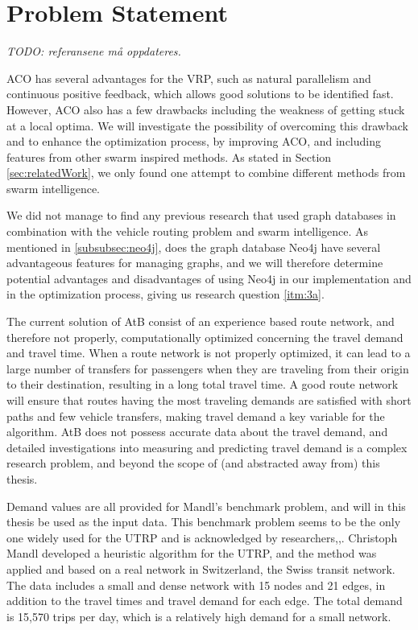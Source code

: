\section{Problem Statement}
\label{sec:problemStatement}

\emph{\color{blue} TODO: referansene må oppdateres.}

ACO has several advantages for the VRP, such as natural parallelism and continuous positive feedback, which allows good solutions to be identified fast. However, ACO also has a few drawbacks including the weakness of getting stuck at a local optima. We will investigate the possibility of overcoming this drawback and to enhance the optimization process, by improving ACO, and including features from other swarm inspired methods. As stated in Section \vref{sec:relatedWork}, we only found one attempt to combine different methods from swarm intelligence.%

We did not manage to find any previous research that used graph databases in combination with the vehicle routing problem and swarm intelligence. As mentioned in \vref{subsubsec:neo4j}, does the graph database Neo4j \citep{website:neo4j} have several advantageous features for managing graphs, and we will therefore determine potential advantages and disadvantages of using Neo4j in our implementation and in the optimization process, giving us research question \vref{itm:3a}.

The current solution of AtB consist of an experience based route network, and therefore not properly, computationally optimized concerning the travel demand and travel time. When a route network is not properly optimized, it can lead to a large number of transfers for passengers when they are traveling from their origin to their destination, resulting in a long total travel time. A good route network will ensure that routes having the most traveling demands are satisfied with short paths and few vehicle transfers, making travel demand a key variable for the algorithm. AtB\citep{website:atb} does not possess accurate data about the travel demand, and detailed investigations into measuring and predicting travel demand is a complex research problem, and beyond the scope of (and abstracted away\citep{cohen88} from) this thesis. 

Demand values are all provided for Mandl's benchmark problem\citep{mandl79}, and will in this thesis be used as the input data. This benchmark problem seems to be the only one widely used for the UTRP and is acknowledged by researchers\citep{fan09},\citep{kechagiopoulos14},\citep{nikolic14}. Christoph Mandl\citep{mandl79} developed a heuristic algorithm for the UTRP, and the method was applied and based on a real network in Switzerland, the Swiss transit network\citep{mandl80}. The data includes a small and dense network with 15 nodes and 21 edges, in addition to the travel times and travel demand for each edge. The total demand is 15,570 trips per day, which is a relatively high demand for a small network.

